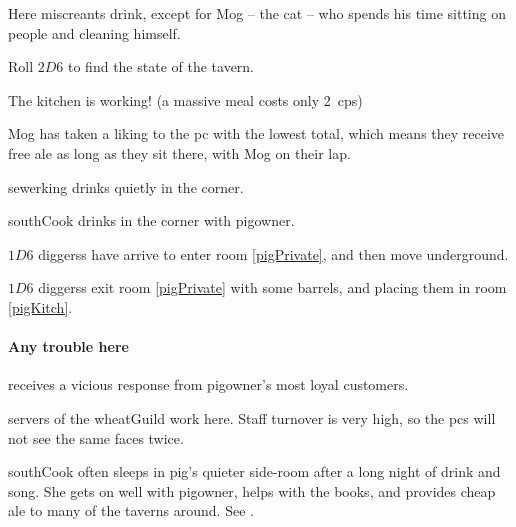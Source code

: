 \begin{multicols}{2}


Here miscreants drink, except for Mog -- the cat -- who spends his time sitting on people and cleaning himself.

Roll $2D6$ to find the state of the tavern.

\begin{dlist}
  \item
  The kitchen is working!
  (a massive meal costs only 2~\glspl{cp})
  \item
  Mog has taken a liking to the \gls{pc} with the lowest  total, which means they receive free ale as long as they sit there, with Mog on their lap.
  \item
  \Gls{sewerking} drinks quietly in the corner.
  \item
  \Gls{southCook} drinks in the corner with \gls{pigowner}.
  \item
  $1D6$ \glspl{diggers} have arrive to enter room \vref{pigPrivate}, and then move underground.
  \item
  $1D6$ \glspl{diggers} exit room \ref{pigPrivate} with some barrels, and placing them in room \vref{pigKitch}.
\end{dlist}

\paragraph{Any trouble here}
receives a vicious response from \gls{pigowner}'s most loyal customers.


\pigowner


\Glspl{server} of the \gls{wheatGuild} work here.
Staff turnover is very high, so the \glspl{pc} will not see the same faces twice.


\Gls{southCook} often sleeps in \gls{pig}'s quieter side-room after a long night of drink and song.
She gets on well with \gls{pigowner}, helps with the books, and provides cheap ale to many of the taverns around.
See .


\end{multicols}
